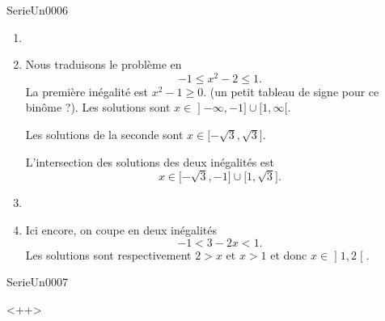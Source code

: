 \documentclass{article}
\begin{document}
\begin{corrige}{SerieUn0006}
\begin{enumerate}
		\item
		\item
			Nous traduisons le problème en
			\begin{equation}
				-1\leq x^2-2\leq 1.
			\end{equation}
			La première inégalité est $x^2-1\geq 0$. (un petit tableau de signe pour ce binôme ?). Les solutions sont $x\in\mathopen] -\infty , -1 \mathclose]\cup\mathopen[ 1 , \infty [$.

			Les solutions de la seconde sont $x\in\mathopen[ -\sqrt{3} , \sqrt{3} \mathclose]$.

			L'intersection des solutions des deux inégalités est
			\begin{equation}
				x\in\mathopen[ -\sqrt{3} , -1 \mathclose]\cup\mathopen[ 1 , \sqrt{3} \mathclose].
			\end{equation}
			

		\item
		\item
			Ici encore, on coupe en deux inégalités
			\begin{equation}
				-1<3-2x<1.
			\end{equation}
			Les solutions sont respectivement $2>x$ et $x>1$ et donc $x\in\mathopen] 1 , 2 \mathclose[$.



	\end{enumerate}
	

\end{corrige}


\begin{corrige}{SerieUn0007}

<++>

\end{corrige}%
\end{document}
